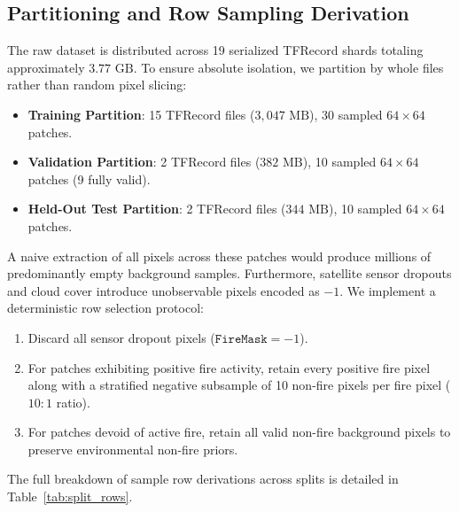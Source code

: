 \documentclass[10pt,journal,compsoc]{IEEEtran}
\begin{document}
\subsection{Partitioning and Row Sampling Derivation}
The raw dataset is distributed across 19 serialized TFRecord shards totaling approximately $3.77\text{ GB}$. To ensure absolute isolation, we partition by whole files rather than random pixel slicing:
\begin{itemize}
    \item \textbf{Training Partition}: 15 TFRecord files ($3,047\text{ MB}$), 30 sampled $64 \times 64$ patches.
    \item \textbf{Validation Partition}: 2 TFRecord files ($382\text{ MB}$), 10 sampled $64 \times 64$ patches (9 fully valid).
    \item \textbf{Held-Out Test Partition}: 2 TFRecord files ($344\text{ MB}$), 10 sampled $64 \times 64$ patches.
\end{itemize}

A naive extraction of all pixels across these patches would produce millions of predominantly empty background samples. Furthermore, satellite sensor dropouts and cloud cover introduce unobservable pixels encoded as $-1$. We implement a deterministic row selection protocol:
\begin{enumerate}
    \item Discard all sensor dropout pixels ($\texttt{FireMask} = -1$).
    \item For patches exhibiting positive fire activity, retain every positive fire pixel along with a stratified negative subsample of 10 non-fire pixels per fire pixel ($10:1$ ratio).
    \item For patches devoid of active fire, retain all valid non-fire background pixels to preserve environmental non-fire priors.
\end{enumerate}

The full breakdown of sample row derivations across splits is detailed in Table~\ref{tab:split_rows}.
\end{document}
